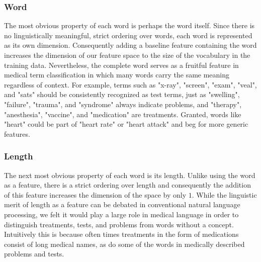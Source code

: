 \documentclass[preprint]{style}
\begin{document}
\subsubsection{Word}
The most obvious property of each word is perhaps the word itself. Since there is no linguistically meaningful, strict ordering over words, each word is represented as its own dimension. Consequently adding a baseline feature containing the word increases the dimension of our feature space to the size of the vocabulary in the training data. Nevertheless, the complete word serves as a fruitful feature in medical term classification in which many words carry the same meaning regardless of context. For example, terms such as "x-ray", "screen", "exam", "veal", and "sats" should be consistently recognized as test terms, just as "swelling", "failure", "trauma", and "syndrome" always indicate problems, and "therapy", "anesthesia", "vaccine", and "medication" are treatments. Granted, words like "heart" could be part of "heart rate" or "heart attack" and beg for more generic features.

\subsubsection{Length}
The next most obvious property of each word is its length. Unlike using the word as a feature, there is a strict ordering over length and consequently the addition of this feature increases the dimension of the space by only $1$. While the linguistic merit of length as a feature can be debated in conventional natural language processing, we felt it would play a large role in medical language in order to distinguish treatments, tests, and problems from words without a concept. Intuitively this is because often times treatments in the form of medications consist of long medical names, as do some of the words in medically described problems and tests.
\end{document}
